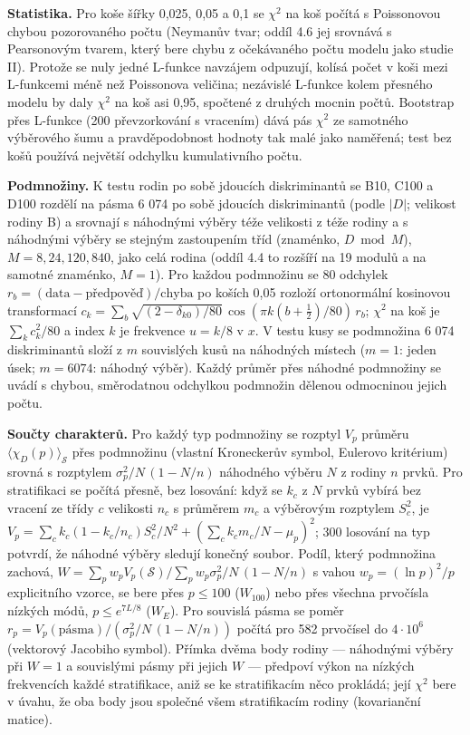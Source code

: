 \documentclass[
  10pt,
]{article}
\begin{document}
\textbf{Statistika.} Pro koše šířky 0,025, 0,05 a 0,1 se \(\chi^2\) na
koš počítá s Poissonovou chybou pozorovaného počtu (Neymanův tvar; oddíl
4.6 jej srovnává s Pearsonovým tvarem, který bere chybu z očekávaného
počtu modelu jako studie II). Protože se nuly jedné L-funkce navzájem
odpuzují, kolísá počet v koši mezi L-funkcemi méně než Poissonova
veličina; nezávislé L-funkce kolem přesného modelu by daly \(\chi^2\) na
koš asi 0,95, spočtené z druhých mocnin počtů. Bootstrap přes L-funkce
(200 převzorkování s vracením) dává pás \(\chi^2\) ze samotného
výběrového šumu a pravděpodobnost hodnoty tak malé jako naměřená; test
bez košů používá největší odchylku kumulativního počtu.

\textbf{Podmnožiny.} K testu rodin po sobě jdoucích diskriminantů se
B10, C100 a D100 rozdělí na pásma 6 074 po sobě jdoucích diskriminantů
(podle \(|D|\); velikost rodiny B) a srovnají s náhodnými výběry téže
velikosti z téže rodiny a s náhodnými výběry se stejným zastoupením tříd
(znaménko, \(D \bmod M\)), \(M = 8, 24, 120, 840\), jako celá rodina
(oddíl 4.4 to rozšíří na 19 modulů a na samotné znaménko, \(M = 1\)).
Pro každou podmnožinu se 80 odchylek
\(r_b = (\text{data} - \text{předpověď})/\text{chyba}\) po koších 0,05
rozloží ortonormální kosinovou transformací
\(c_k = \sum_b \sqrt{(2 - \delta_{k0})/80}\,\cos(\pi k(b + \frac12)/80)\,r_b\);
\(\chi^2\) na koš je \(\sum_k c_k^2/80\) a index \(k\) je frekvence
\(u = k/8\) v \(x\). V testu kusy se podmnožina 6 074 diskriminantů
složí z \(m\) souvislých kusů na náhodných místech (\(m = 1\): jeden
úsek; \(m = 6074\): náhodný výběr). Každý průměr přes náhodné podmnožiny
se uvádí s chybou, směrodatnou odchylkou podmnožin dělenou odmocninou
jejich počtu.

\textbf{Součty charakterů.} Pro každý typ podmnožiny se rozptyl \(V_p\)
průměru \(\langle\chi_D(p)\rangle_{\mathcal S}\) přes podmnožinu
(vlastní Kroneckerův symbol, Eulerovo kritérium) srovná s rozptylem
\(\sigma_p^2/N\,(1 - N/n)\) náhodného výběru \(N\) z rodiny \(n\) prvků.
Pro stratifikaci se počítá přesně, bez losování: když se \(k_c\) z \(N\)
prvků vybírá bez vracení ze třídy \(c\) velikosti \(n_c\) s průměrem
\(m_c\) a výběrovým rozptylem \(S_c^2\), je
\(V_p = \sum_c k_c(1 - k_c/n_c)S_c^2/N^2 + (\sum_c k_c m_c/N - \mu_p)^2\);
300 losování na typ potvrdí, že náhodné výběry sledují konečný soubor.
Podíl, který podmnožina zachová,
\(W = \sum_p w_p V_p(\mathcal S)/\sum_p w_p \sigma_p^2/N\,(1 - N/n)\) s
vahou \(w_p = (\ln p)^2/p\) explicitního vzorce, se bere přes
\(p \le 100\) (\(W_{100}\)) nebo přes všechna prvočísla nízkých módů,
\(p \le e^{7L/8}\) (\(W_E\)). Pro souvislá pásma se poměr
\(r_p = V_p(\text{pásma})/(\sigma_p^2/N\,(1 - N/n))\) počítá pro 582
prvočísel do \(4\cdot10^6\) (vektorový Jacobiho symbol). Přímka dvěma
body rodiny --- náhodnými výběry při \(W = 1\) a souvislými pásmy při
jejich \(W\) --- předpoví výkon na nízkých frekvencích každé
stratifikace, aniž se ke stratifikacím něco prokládá; její \(\chi^2\)
bere v úvahu, že oba body jsou společné všem stratifikacím rodiny
(kovarianční matice).
\end{document}
